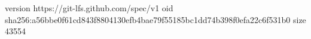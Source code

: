 version https://git-lfs.github.com/spec/v1
oid sha256:a56bbe0f61cd843f8804130efb4bae79f55185bc1dd74b398f0efa22c6f531b0
size 43554
